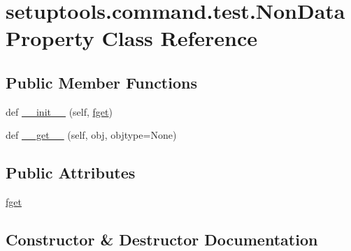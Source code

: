 \hypertarget{classsetuptools_1_1command_1_1test_1_1NonDataProperty}{}\section{setuptools.\+command.\+test.\+Non\+Data\+Property Class Reference}
\label{classsetuptools_1_1command_1_1test_1_1NonDataProperty}
\subsection*{Public Member Functions}
\begin{DoxyCompactItemize}
\item 
def \hyperlink{classsetuptools_1_1command_1_1test_1_1NonDataProperty_a9bb4953a9e935a826475a360115b88f6}{\+\_\+\+\_\+init\+\_\+\+\_\+} (self, \hyperlink{classsetuptools_1_1command_1_1test_1_1NonDataProperty_ad59546ea0d8398ba23232ffb41515f66}{fget})
\item 
def \hyperlink{classsetuptools_1_1command_1_1test_1_1NonDataProperty_a29f10b015e01c1fa37f1af0a0a50fc03}{\+\_\+\+\_\+get\+\_\+\+\_\+} (self, obj, objtype=None)
\end{DoxyCompactItemize}
\subsection*{Public Attributes}
\begin{DoxyCompactItemize}
\item 
\hyperlink{classsetuptools_1_1command_1_1test_1_1NonDataProperty_ad59546ea0d8398ba23232ffb41515f66}{fget}
\end{DoxyCompactItemize}


\subsection{Constructor \& Destructor Documentation}
\mbox{\label{classsetuptools_1_1command_1_1test_1_1NonDataProperty_a9bb4953a9e935a826475a360115b88f6}} 

